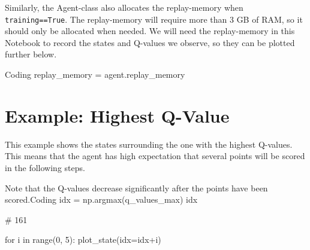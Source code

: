 \documentclass{article}
\begin{document}
Similarly, the Agent-class also allocates the replay-memory when
\texttt{training==True}. The replay-memory will require more than 3 GB
of RAM, so it should only be allocated when needed. We will need the
replay-memory in this Notebook to record the states and Q-values we
observe, so they can be plotted further below.
\begin{langPyOne}{Coding}
replay_memory = agent.replay_memory
\end{langPyOne}

\section{Example: Highest Q-Value}

This example shows the states surrounding the one with the highest Q-values. This means that the agent has high expectation that several points will be scored in the following steps.
\begin{langPyTwo}{Note that the Q-values decrease significantly after the points have been scored.}{Coding}
idx = np.argmax(q_values_max)
idx

# 161

for i in range(0, 5):
    plot_state(idx=idx+i)
\end{langPyTwo}

\end{document}
